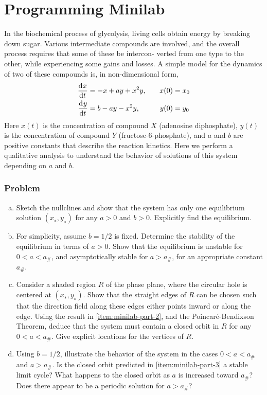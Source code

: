 \documentclass[12pt]{article}
\begin{document}
\newpage
\section{Programming Minilab}
In the biochemical process of glycolysis, living cells obtain energy by breaking
down sugar. Various intermediate compounds are involved, and the overall process
requires that some of these be intercon- verted from one type to the other,
while experiencing some gains and losses. A simple model for the dynamics of two
of these compounds is, in non-dimensional form,
\begin{equation}
  \label{eq:minilab-problem}
  \begin{aligned}
    \frac{\mathrm{d}^{} {x}}{\mathrm{d}{t}^{}} &= -x+ay+x^2y,&\quad x(0)&=x_0 \\
    \frac{\mathrm{d}^{} {y}}{\mathrm{d}{t}^{}} &= b-ay-x^2y,&\quad y(0)&=y_0 \\
  \end{aligned}
\end{equation}
Here $x(t)$ is the concentration of compound $X$ (adenosine diphosphate), $y(t)$
is the concentration of compound $Y$ (fructose-6-phosphate), and $a$ and $b$ are
positive constants that describe the reaction kinetics. Here we perform a
qualitative analysis to understand the behavior of solutions of this system
depending on $a$ and $b$.
\subsubsection*{Problem}
\begin{enumerate}[(a)]
\item Sketch the nullclines and show that the system has only one equilibrium
  solution $(x_∗, y_∗)$ for any $a > 0$ and $b > 0$. Explicitly find the
  equilibrium.
\item \label{item:minilab-part-2} For simplicity, assume $b = 1/2$ is fixed.
  Determine the stability of the equilibrium in terms of $a > 0$. Show that the
  equilibrium is unstable for $0 < a < a_{\#}$, and asymptotically stable for $a >
  a_{\#}$, for an appropriate constant $a_{\#}$.
\item \label{item:minilab-part-3} Consider a shaded region $R$ of the phase
  plane, where the circular hole is centered at $(x_∗, y_∗)$. Show that the
  straight edges of $R$ can be chosen such that the direction field along these
  edges either points inward or along the edge. Using the result in
  \cref{item:minilab-part-2}, and the Poincar\'{e}-Bendixson Theorem, deduce that
  the system must contain a closed orbit in $R$ for any $0 < a < a_{\#}$. Give
  explicit locations for the vertices of $R$.
\item Using $b = 1/2$, illustrate the behavior of the system in the cases $0 < a
  < a_{\#}$ and $a > a_{\#}$. Is the closed orbit predicted in
  \cref{item:minilab-part-3} a stable limit cycle? What happens to the closed
  orbit as $a$ is increased toward $a_{\#}$? Does there appear to be a periodic
  solution for $a > a_{\#}$?
\end{enumerate}
\newpage
\end{document}
